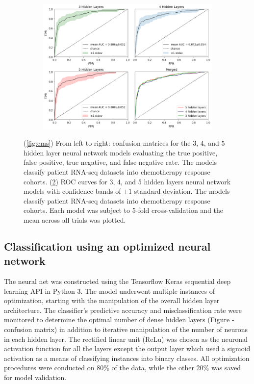 \documentclass[10pt, letterpaper]{article}
\begin{document}
\begin{multicols}{2}
\begin{figure}[!ht]
    \begin{subfigure}[t]{\textwidth}
        \centering
        \includegraphics[width=\textwidth]{Figures/roc/full_merged.png}
        \caption{}
        \label{fig:roc}
    \end{subfigure}

    \caption{(\ref{fig:cms}) From left to right: confusion matrices for the 3, 4, and 5 hidden layer neural network models evaluating the true positive, false positive, true negative, and false negative rate. The models classify patient RNA-seq datasets into chemotherapy response cohorts. (\ref{fig:roc}) ROC curves for 3, 4, and 5 hidden layers neural network models with confidence bands of $\pm 1$ standard deviation. The models classify patient RNA-seq datasets into chemotherapy response cohorts. Each model was subject to 5-fold cross-validation and the mean across all trials was plotted.}
\end{figure}



\subsection*{Classification using an optimized neural network}
The neural net was constructed using the Tensorflow Keras sequential deep learning API in Python 3. The model underwent multiple instances of optimization, starting with the manipulation of the overall hidden layer architecture. The classifier’s predictive accuracy and misclassification rate were monitored to determine the optimal number of dense hidden layers (Figure - confusion matrix) in addition to iterative manipulation of the number of neurons in each hidden layer. The rectified linear unit (ReLu) was chosen as the neuronal activation function for all the layers except the output layer which used a sigmoid activation as a means of classifying instances into binary classes. All optimization procedures were conducted on 80\% of the data, while the other 20\% was saved for model validation.


\end{multicols}
\end{document}
